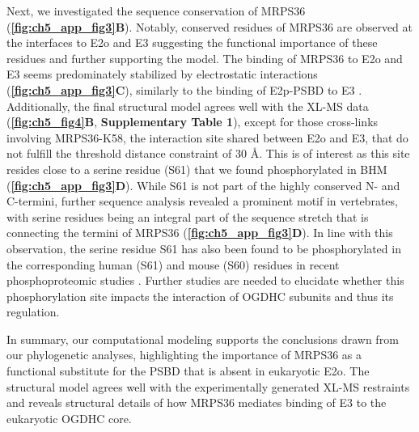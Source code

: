 Next, we investigated the sequence conservation of MRPS36 (\textbf{\autoref{fig:ch5_app_fig3}B}). Notably, conserved residues of MRPS36 are observed at the interfaces to E2o and E3 suggesting the functional importance of these residues and further supporting the model. The binding of MRPS36 to E2o and E3 seems predominately stabilized by electrostatic interactions (\textbf{\autoref{fig:ch5_app_fig3}C}), similarly to the binding of E2p-PSBD to E3 \cite{Mande_1996}. Additionally, the final structural model agrees well with the XL-MS data (\textbf{\autoref{fig:ch5_fig4}B}, \textbf{Supplementary Table 1}), except for those cross-links involving MRPS36-K58, the interaction site shared between E2o and E3, that do not fulfill the threshold distance constraint of 30 Å. This is of interest as this site resides close to a serine residue (S61) that we found phosphorylated in BHM (\textbf{\autoref{fig:ch5_app_fig3}D}). While S61 is not part of the highly conserved N- and C-termini, further sequence analysis revealed a prominent motif in vertebrates, with serine residues being an integral part of the sequence stretch that is connecting the termini of MRPS36 (\textbf{\autoref{fig:ch5_app_fig3}D}). In line with this observation, the serine residue S61 has also been found to be phosphorylated in the corresponding human (S61) and mouse (S60) residues in recent phosphoproteomic studies \cite{Mertins_2016, Sharma_2014, Wilson-Grady_2013}. Further studies are needed to elucidate whether this phosphorylation site impacts the interaction of OGDHC subunits and thus its regulation.

In summary, our computational modeling supports the conclusions drawn from our phylogenetic analyses, highlighting the importance of MRPS36 as a functional substitute for the PSBD that is absent in eukaryotic E2o. The structural model agrees well with the experimentally generated XL-MS restraints and reveals structural details of how MRPS36 mediates binding of E3 to the eukaryotic OGDHC core.
%
